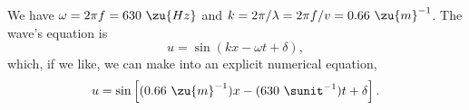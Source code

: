 We have $\omega=2\pi f=630\ \zu{Hz}$ and $k=2\pi/\lambda=2\pi f/v=0.66\ \zu{m}^{-1}$.
The wave's equation is
\begin{equation*}
  u = \sin(kx-\omega t+\delta),
\end{equation*}
which, if we like, we can make into an explicit numerical equation,
\begin{equation*}
  u = \sin\left[(0.66\ \zu{m}^{-1})x-(630\ \sunit^{-1}) t+\delta\right].
\end{equation*}
